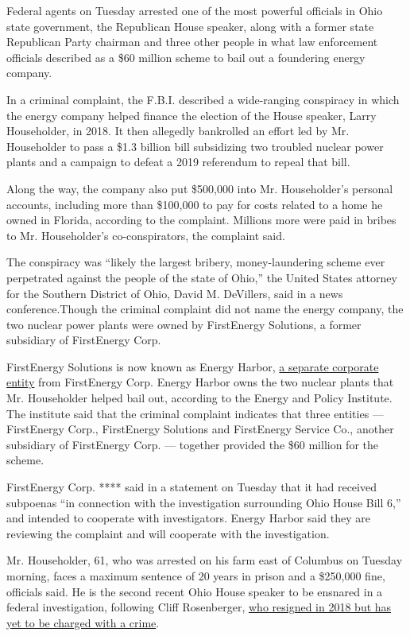 Federal agents on Tuesday arrested one of the most powerful officials in
Ohio state government, the Republican House speaker, along with a former
state Republican Party chairman and three other people in what law
enforcement officials described as a \$60 million scheme to bail out a
foundering energy company.

In a criminal complaint, the F.B.I. described a wide-ranging conspiracy
in which the energy company helped finance the election of the House
speaker, Larry Householder, in 2018. It then allegedly bankrolled an
effort led by Mr. Householder to pass a \$1.3 billion bill subsidizing
two troubled nuclear power plants and a campaign to defeat a 2019
referendum to repeal that bill.

Along the way, the company also put \$500,000 into Mr. Householder's
personal accounts, including more than \$100,000 to pay for costs
related to a home he owned in Florida, according to the complaint.
Millions more were paid in bribes to Mr. Householder's co-conspirators,
the complaint said.

The conspiracy was ``likely the largest bribery, money-laundering scheme
ever perpetrated against the people of the state of Ohio,'' the United
States attorney for the Southern District of Ohio, David M. DeVillers,
said in a news conference.Though the criminal complaint did not name the
energy company, the two nuclear power plants were owned by FirstEnergy
Solutions, a former subsidiary of FirstEnergy Corp.

FirstEnergy Solutions is now known as Energy Harbor,
\href{https://www.energyandpolicy.org/energy-harbor/}{a separate
corporate entity} from FirstEnergy Corp. Energy Harbor owns the two
nuclear plants that Mr. Householder helped bail out, according to the
Energy and Policy Institute. The institute said that the criminal
complaint indicates that three entities --- FirstEnergy Corp.,
FirstEnergy Solutions and FirstEnergy Service Co., another subsidiary of
FirstEnergy Corp. --- together provided the \$60 million for the scheme.

FirstEnergy Corp. **** said in a statement on Tuesday that it had
received subpoenas ``in connection with the investigation surrounding
Ohio House Bill 6,'' and intended to cooperate with investigators.
Energy Harbor said they are reviewing the complaint and will cooperate
with the investigation.

Mr. Householder, 61, who was arrested on his farm east of Columbus on
Tuesday morning, faces a maximum sentence of 20 years in prison and a
\$250,000 fine, officials said. He is the second recent Ohio House
speaker to be ensnared in a federal investigation, following Cliff
Rosenberger,
\href{https://www.daytondailynews.com/news/fbi-case-continues-year-after-ohio-house-speaker-rosenberger-resigned/MprQEzliOlvmk9jRkGbVyN/}{who
resigned in 2018 but has yet to be charged with a crime}.

